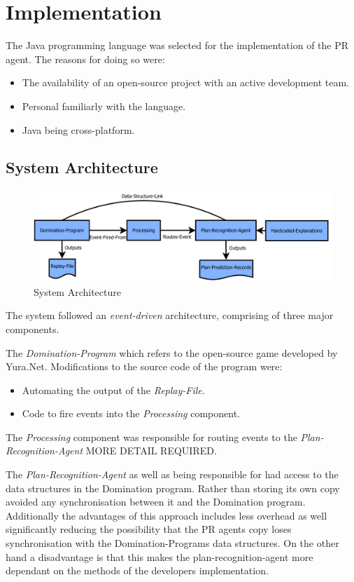 \documentclass[parskip]{cs4rep}
\begin{document}
\chapter{Implementation}

The Java programming language was selected for the implementation of the PR agent. The reasons for doing so were:

\begin{itemize}
\item
The availability of an open-source project with an active development team.
\item
Personal familiarly with the language.
\item
Java being cross-platform.
\end{itemize}

\section{System Architecture}

\begin{figure}[h]
\centerline{
\includegraphics[width=1.2\textwidth]{images/system-architecture}
}
\caption{System Architecture}
\end{figure} 

The system followed an \textit{event-driven} architecture, comprising of three major components.

The \textit{Domination-Program} which refers to the open-source game developed by Yura.Net. Modifications to the source code of the program were:

\begin{itemize}
\item
Automating the output of the \textit{Replay-File}.
\item
Code to fire events into the \textit{Processing} component. 
\end{itemize}

The \textit{Processing} component was responsible for routing events to the \textit{Plan-Recognition-Agent} MORE DETAIL REQUIRED.

The \textit{Plan-Recognition-Agent} as well as being responsible for had access to the data structures in the Domination program. Rather than storing its own copy avoided any synchronisation between it and the Domination program. Additionally the advantages of this approach includes less overhead as well significantly reducing the possibility that the PR agents copy loses synchronisation with the Domination-Programs data structures. On the other hand a disadvantage is that this makes the plan-recognition-agent more dependant on the methods of the developers implementation.
\end{document}
